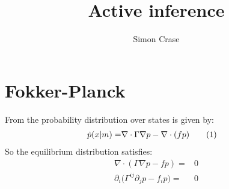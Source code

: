 \documentclass[]{article}
\title{Active inference}
\author{Simon Crase}
\newcommand\numberthis{\addtocounter{equation}{1}\tag{\theequation}}
\begin{document}
\maketitle

\begin{abstract}

\end{abstract}

\tableofcontents

\section{Fokker-Planck}

From \cite{friston_life_2013} the probability distribution over states is given by:
\begin{align*}
	\dot{p}(x\vert m) =& \nabla \cdot \Gamma \nabla p -\nabla \cdot(f p) \numberthis \label{eq:fokker:planck}
\end{align*}
So the equilibrium distribution satisfies:
\begin{align*}
	\nabla \cdot (\Gamma \nabla p -f p)=&0\\
	\partial_i \big(\Gamma^{ij} \partial_j p -f_i p \big)=& 0
\end{align*}



\end{document}
